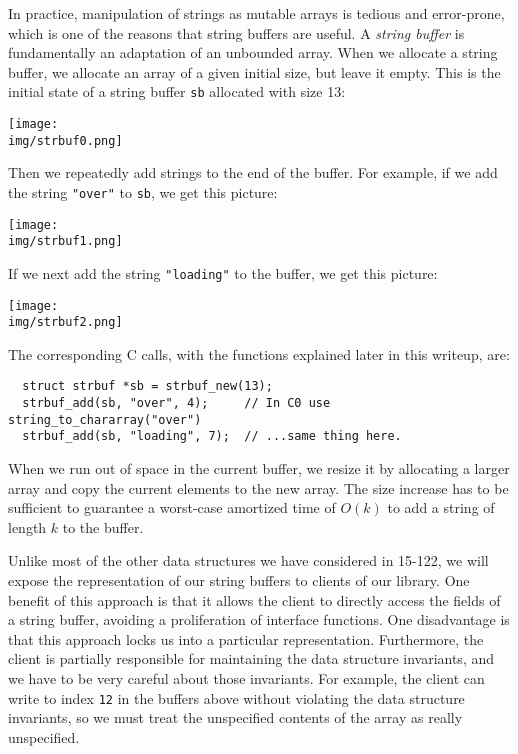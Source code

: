 \documentclass[12pt]{exam}
\begin{document}
In practice, manipulation of strings as mutable arrays is tedious and
error-prone, which is one of the reasons that string buffers are
useful.  A \emph{string buffer} is fundamentally an adaptation of an
unbounded array.  When we allocate a string buffer, we allocate an
array of a given initial size, but leave it empty.  This is the
initial state of a string buffer \lstinline'sb' allocated with size
13:
\begin{center}
\texttt{[image: \\img/strbuf0.png]}
\end{center}
Then we repeatedly add strings to the end of the buffer.  For example,
if we add the string \lstinline'"over"' to \lstinline'sb', we get this
picture:
\begin{center}
\texttt{[image: \\img/strbuf1.png]}
\end{center}
If we next add the string \lstinline'"loading"' to the buffer, we
get this picture:
\begin{center}
\texttt{[image: \\img/strbuf2.png]}
\end{center}
The corresponding C calls, with the functions explained later in this
writeup, are:
\begin{lstlisting}
  struct strbuf *sb = strbuf_new(13);
  strbuf_add(sb, "over", 4);     // In C0 use string_to_chararray("over")
  strbuf_add(sb, "loading", 7);  // ...same thing here.
\end{lstlisting}
When we run out of space in the current buffer, we resize it by
allocating a larger array and copy the current elements to the new
array.  The size increase has to be sufficient to guarantee a
worst-case amortized time of $O(k)$ to add a string of length $k$ to
the buffer.

Unlike most of the other data structures we have considered in 15-122,
we will expose the representation of our string buffers to clients of
our library.  One benefit of this approach is that it allows the
client to directly access the fields of a string buffer, avoiding a
proliferation of interface functions.  One disadvantage is that this
approach locks us into a particular representation.  Furthermore, the
client is partially responsible for maintaining the data structure
invariants, and we have to be very careful about those invariants. For
example, the client can write to index \lstinline'12' in the buffers
above without violating the data structure invariants, so we must
treat the unspecified contents of the array as really unspecified.
\end{document}
